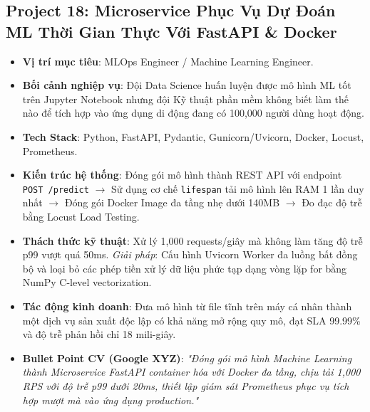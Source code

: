 \subsection{Project 18: Microservice Phục Vụ Dự Đoán ML Thời Gian Thực Với FastAPI \& Docker}
\begin{itemize}
    \item \textbf{Vị trí mục tiêu}: MLOps Engineer / Machine Learning Engineer.
    \item \textbf{Bối cảnh nghiệp vụ}: Đội Data Science huấn luyện được mô hình ML tốt trên Jupyter Notebook nhưng đội Kỹ thuật phần mềm không biết làm thế nào để tích hợp vào ứng dụng di động đang có 100,000 người dùng hoạt động.
    \item \textbf{Tech Stack}: Python, FastAPI, Pydantic, Gunicorn/Uvicorn, Docker, Locust, Prometheus.
    \item \textbf{Kiến trúc hệ thống}: Đóng gói mô hình thành REST API với endpoint \texttt{POST /predict} $\rightarrow$ Sử dụng cơ chế \texttt{lifespan} tải mô hình lên RAM 1 lần duy nhất $\rightarrow$ Đóng gói Docker Image đa tầng nhẹ dưới 140MB $\rightarrow$ Đo đạc độ trễ bằng Locust Load Testing.
    \item \textbf{Thách thức kỹ thuật}: Xử lý 1,000 requests/giây mà không làm tăng độ trễ p99 vượt quá 50ms. \textit{Giải pháp}: Cấu hình Uvicorn Worker đa luồng bất đồng bộ và loại bỏ các phép tiền xử lý dữ liệu phức tạp dạng vòng lặp for bằng NumPy C-level vectorization.
    \item \textbf{Tác động kinh doanh}: Đưa mô hình từ file tĩnh trên máy cá nhân thành một dịch vụ sản xuất độc lập có khả năng mở rộng quy mô, đạt SLA 99.99\% và độ trễ phản hồi chỉ 18 mili-giây.
    \item \textbf{Bullet Point CV (Google XYZ)}: \textit{"Đóng gói mô hình Machine Learning thành Microservice FastAPI container hóa với Docker đa tầng, chịu tải 1,000 RPS với độ trễ p99 dưới 20ms, thiết lập giám sát Prometheus phục vụ tích hợp mượt mà vào ứng dụng production."}
\end{itemize}

